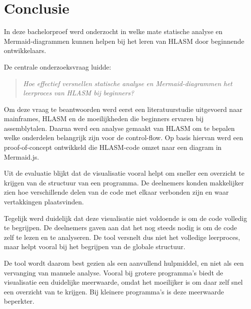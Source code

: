 
\chapter{Conclusie}%
\label{ch:conclusie}



In deze bachelorproef werd onderzocht in welke mate statische analyse en Mermaid-diagrammen kunnen helpen bij het leren van HLASM door beginnende ontwikkelaars. 

De centrale onderzoeksvraag luidde:

\begin{quote}
    \itshape
    Hoe effectief versnellen statische analyse en Mermaid-diagrammen het leerproces van HLASM bij beginners?
\end{quote}

Om deze vraag te beantwoorden werd eerst een literatuurstudie uitgevoerd naar mainframes, HLASM en de moeilijkheden die beginners ervaren bij assemblytalen. Daarna werd een analyse gemaakt van HLASM om te bepalen welke onderdelen belangrijk zijn voor de control-flow. Op basis hiervan werd een proof-of-concept ontwikkeld die HLASM-code omzet naar een diagram in Mermaid.js.

Uit de evaluatie blijkt dat de visualisatie vooral helpt om sneller een overzicht te krijgen van de structuur van een programma. De deelnemers konden makkelijker zien hoe verschillende delen van de code met elkaar verbonden zijn en waar vertakkingen plaatsvinden.

Tegelijk werd duidelijk dat deze visualisatie niet voldoende is om de code volledig te begrijpen. De deelnemers gaven aan dat het nog steeds nodig is om de code zelf te lezen en te analyseren. De tool versnelt dus niet het volledige leerproces, maar helpt vooral bij het begrijpen van de globale structuur.

De tool wordt daarom best gezien als een aanvullend hulpmiddel, en niet als een vervanging van manuele analyse. Vooral bij grotere programma’s biedt de visualisatie een duidelijke meerwaarde, omdat het moeilijker is om daar zelf snel een overzicht van te krijgen. Bij kleinere programma’s is deze meerwaarde beperkter.

